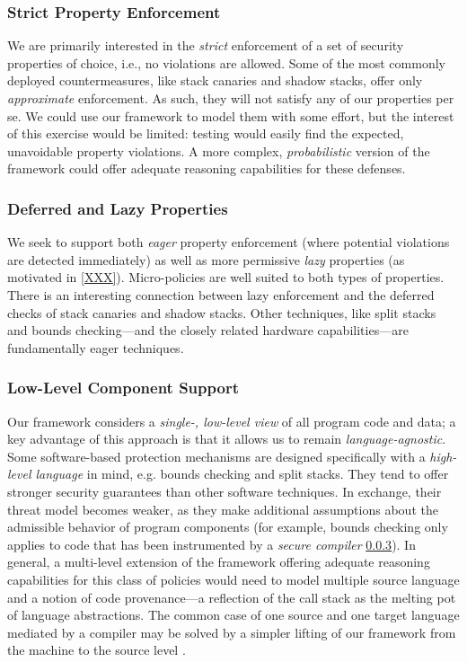 \subsubsection{Strict Property Enforcement}
%
We are primarily interested in the \emph{strict} enforcement of a set of
security properties of choice, i.e., no violations are allowed. Some 
of the most commonly deployed countermeasures, like stack canaries and shadow
stacks, offer only \emph{approximate} enforcement. As such, they will not
satisfy any of our properties per se. We could use our framework to model them
with some effort, but the interest of this exercise would be limited: testing
would easily find the expected, unavoidable property violations. A more complex,
\emph{probabilistic} version of the framework could offer adequate reasoning
capabilities for these defenses.

\subsubsection{Deferred and Lazy Properties}
%
We seek to support both \emph{eager} property enforcement (where potential
violations are detected immediately) as well as more permissive \emph{lazy}
properties (as motivated in \cref{XXX}).
%
Micro-policies are well suited to both types of properties. There is an
interesting connection between lazy enforcement and the deferred checks of stack
canaries and shadow stacks. Other techniques, like split stacks and bounds
checking---and the closely related hardware capabilities---are fundamentally
eager techniques.

\subsubsection{Low-Level Component Support}
%
Our framework considers a \emph{single-, low-level view} of all program code and
data; a key advantage of this approach is that it allows us to remain
\emph{language-agnostic}.
%
Some software-based protection mechanisms are designed specifically with
a \emph{high-level language} in mind, e.g. bounds checking and split stacks.
They tend to offer stronger security guarantees than other software techniques.
In exchange, their threat model becomes weaker, as they make additional
assumptions about the admissible behavior of program components
%
(for example, bounds checking only applies to code that has been instrumented by
a \emph{secure compiler} \ref{}).
%
In general, a multi-level extension of the framework offering adequate reasoning
capabilities for this class of policies would need to model multiple source
language and a notion of code provenance---a reflection of the call stack as the
melting pot of language abstractions.
%
The common case of one source and one target language mediated by a compiler may
be solved by a simpler lifting of our framework from the machine to the source
level .

